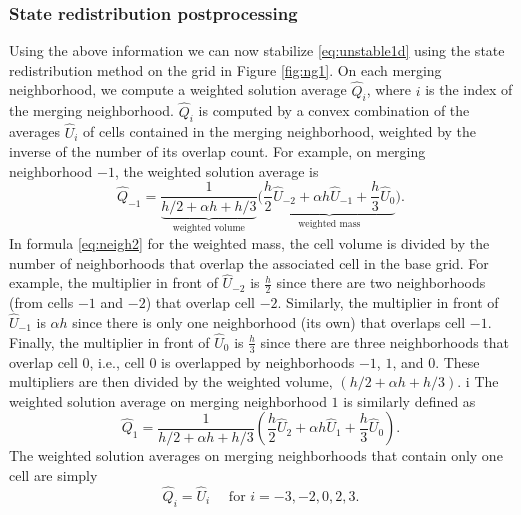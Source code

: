 \subsubsection*{State redistribution postprocessing}
Using the above information we can now stabilize \eqref{eq:unstable1d} using the state redistribution 
method on the grid in Figure \ref{fig:ng1}.  
On each merging neighborhood, we compute a weighted solution average $\widehat Q_i$, where $i$ is the 
index of the merging neighborhood. 
$\widehat Q_i$ is computed by a convex combination of the averages $\widehat{U}_i$ of cells contained in the 
merging neighborhood, weighted by the inverse of the number of its overlap count. 
For example, on merging neighborhood $-1$, the weighted solution average is
\begin{equation}\label{eq:neigh2}
\widehat{Q}_{-1} = \frac{1}{\underbrace{h/2 + \alpha h + h/3}_{\text{weighted volume}}}\biggr( \underbrace{\frac{h}{2} \widehat{U}_{-2} + \alpha h \widehat{U}_{-1} + \frac{h}{3}\widehat{U}_{0}}_{\text{weighted mass}} \biggr).
\end{equation}
In formula \eqref{eq:neigh2}  for the weighted mass,
the cell volume is divided by the number of neighborhoods that overlap the associated cell 
in the base grid. 
For example, the multiplier in front of $\widehat{U}_{-2}$ is $\frac{h}{2}$ since there are 
two neighborhoods (from cells $-1$ and $-2$) that overlap cell $-2$.  
Similarly, the multiplier in front of $\widehat{U}_{-1}$ is $\alpha h$ since there is only 
one neighborhood (its own) that overlaps cell $-1$.
Finally, the multiplier in front of $\widehat{U}_{0}$ is $\frac{h}{3}$ since there are three neighborhoods that overlap cell $0$, i.e., cell $0$ is overlapped by neighborhoods $-1$, $1$, and $0$.
These multipliers are then divided by the weighted volume,  $(h/2 + \alpha h + h/3)$.
i%
The weighted solution average on merging neighborhood $1$ is similarly defined as
\begin{equation}\label{eq:neigh3}
\widehat{Q}_{1} = \frac{1}{h/2 + \alpha h + h/3}\left( \frac{h}{2} \widehat{U}_{2} + \alpha h \widehat{U}_{1} + \frac{h}{3}\widehat{U}_{0} \right).
\end{equation}
The weighted solution averages on merging neighborhoods that contain only one cell are simply 
\begin{equation}\label{eq:neigh1}
\widehat{Q}_i = \widehat{U}_i \quad \text{ for } i = -3,-2,0,2,3.
\end{equation}

